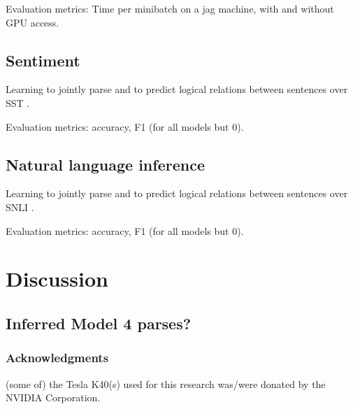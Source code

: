 \documentclass[11pt,letterpaper]{article}
\begin{document}
Evaluation metrics: Time per minibatch on a jag machine, with and without GPU access.

\subsection{Sentiment}

Learning to jointly parse and to predict logical relations between sentences over SST  
\cite{socher2013recursive}.

Evaluation metrics: accuracy, F1 (for all models but 0).


\subsection{Natural language inference}

Learning to jointly parse and to predict logical relations between sentences over SNLI  \cite{snli:emnlp2015}.

Evaluation metrics: accuracy, F1 (for all models but 0).

\section{Discussion}

\subsection{Inferred Model 4 parses?}

\subsubsection*{Acknowledgments}

(some of) the Tesla K40(s) used for this research was/were donated by the NVIDIA Corporation.


 
\end{document}
